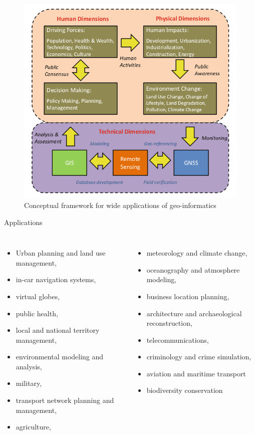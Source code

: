 \documentclass[11pt,dvipsnames,ignorenonframetext,aspectratio=169]{beamer}
\begin{document}
\begin{frame}{}
\protect\hypertarget{section-1}{}
\begin{figure}

{\centering \includegraphics[width=0.65\linewidth]{../images/framework_geoinformatics} 

}

\caption{Conceptual framework for wide applications of geo-informatics}\label{fig:conceptual-framework-geoinformatics}
\end{figure}
\end{frame}

\begin{frame}{Applications}
\protect\hypertarget{applications}{}
\begin{columns}[T, onlytextwidth]
\begin{itemize}
\item Urban planning and land use management,
\item in-car navigation systems,
\item virtual globes,
\item public health,
\item local and national territory management,
\item environmental modeling and analysis,
\item military,
\item transport network planning and management,
\item agriculture,
\end{itemize}
\begin{itemize}
\item meteorology and climate change,
\item oceanography and atmosphere modeling,
\item business location planning,
\item architecture and archaeological reconstruction,
\item telecommunications,
\item criminology and crime simulation,
\item aviation and maritime transport
\item biodiversity conservation
\end{itemize}
\end{columns}
\end{frame}
\end{document}
